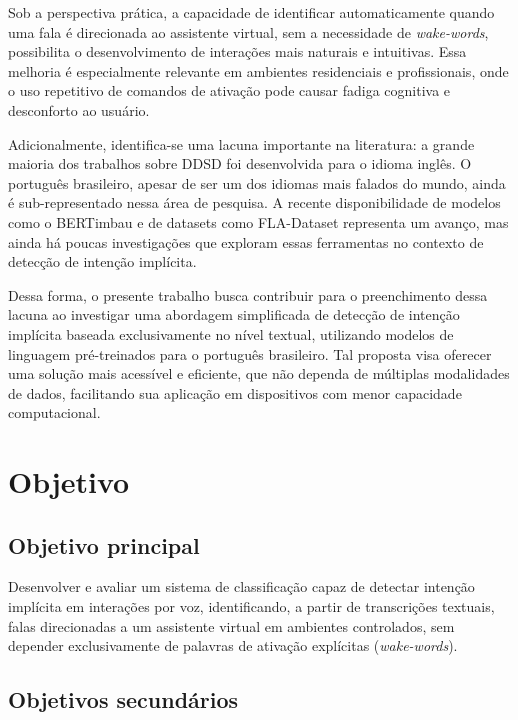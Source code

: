 \documentclass[
    12pt,                %
    openright,           %
    oneside,             %
    a4paper,             %
    english,             %
    brazil               %
]{abntex2}
\begin{document}
Sob a perspectiva prática, a capacidade de identificar automaticamente quando uma fala é direcionada ao assistente virtual, sem a necessidade de \textit{wake-words}, possibilita o desenvolvimento de interações mais naturais e intuitivas. Essa melhoria é especialmente relevante em ambientes residenciais e profissionais, onde o uso repetitivo de comandos de ativação pode causar fadiga cognitiva e desconforto ao usuário. 

Adicionalmente, identifica-se uma lacuna importante na literatura: a grande maioria dos trabalhos sobre DDSD foi desenvolvida para o idioma inglês. O português brasileiro, apesar de ser um dos idiomas mais falados do mundo, ainda é sub-representado nessa área de pesquisa. A recente disponibilidade de modelos como o BERTimbau \cite{Souza2020} e de datasets como FLA-Dataset \cite{Rocha2024} representa um avanço, mas ainda há poucas investigações que exploram essas ferramentas no contexto de detecção de intenção implícita.

Dessa forma, o presente trabalho busca contribuir para o preenchimento dessa lacuna ao investigar uma abordagem simplificada de detecção de intenção implícita baseada exclusivamente no nível textual, utilizando modelos de linguagem pré-treinados para o português brasileiro. Tal proposta visa oferecer uma solução mais acessível e eficiente, que não dependa de múltiplas modalidades de dados, facilitando sua aplicação em dispositivos com menor capacidade computacional.

\section{Objetivo}
\label{sec:objetivo}

\subsection{Objetivo principal}

Desenvolver e avaliar um sistema de classificação capaz de detectar intenção implícita em interações por voz, identificando, a partir de transcrições textuais, falas direcionadas a um assistente virtual em ambientes controlados, sem depender exclusivamente de palavras de ativação explícitas (\textit{wake-words}).

\subsection{Objetivos secundários}
\end{document}
